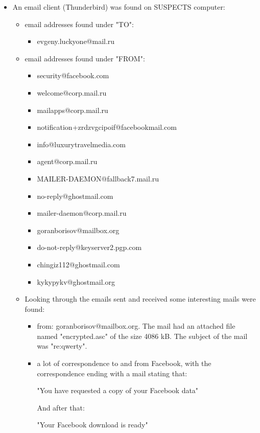 \begin{enumerate}
\begin{itemize}
	\item An email client (Thunderbird) was found on SUSPECTS computer: 
		\begin{itemize}
			\item email addresses found under "TO":
				\begin{itemize}
					\item evgeny.luckyone@mail.ru
				\end{itemize}
			\item email addresses found under "FROM":
				\begin{itemize}
					\item security@facebook.com
					\item welcome@corp.mail.ru
					\item mailapps@corp.mail.ru
					\item notification+zrdzvgcipoif@facebookmail.com
					\item info@luxurytravelmedia.com
					\item agent@corp.mail.ru
					\item MAILER-DAEMON@fallback7.mail.ru
					\item no-reply@ghostmail.com
					\item mailer-daemon@corp.mail.ru
					\item goranborisov@mailbox.org
					\item do-not-reply@keyserver2.pgp.com
					
					\item chingiz112@ghostmail.com
					\item kykypykv@ghostmail.org
				\end{itemize}
			
			\item Looking through the emails sent and received some interesting mails were found: 
			
			\begin{itemize}
				\item from: goranborisov@mailbox.org. The mail had an attached file named "encrypted.asc" of the size 4086 kB. The subject of the mail was "re:qwerty". 
				
				\item a lot of correspondence to and from Facebook, with the correspondence ending with a mail stating that:
				
				"You have requested a copy of your Facebook data"
				
				And after that:
				
				"Your Facebook download is ready"
				

\end{itemize}
\end{itemize}
\end{itemize}
\end{enumerate}
